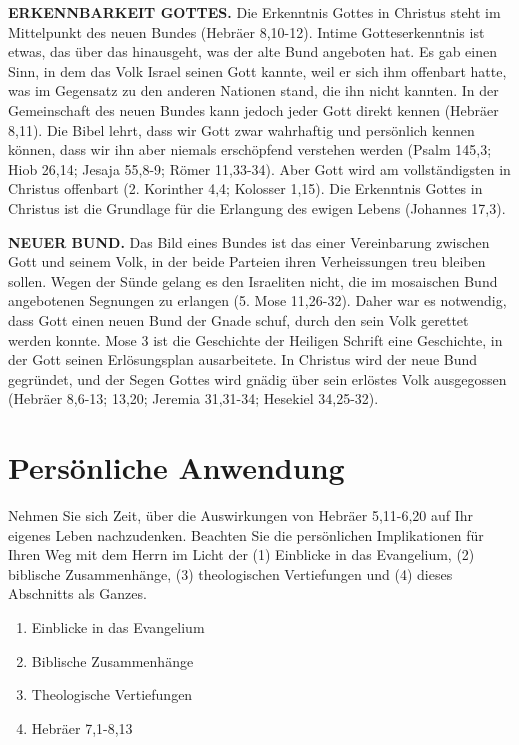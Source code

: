 \documentclass[]{krantz}
\providecommand{\tightlist}{%
  \setlength{\itemsep}{0pt}\setlength{\parskip}{0pt}}
\begin{document}
\textbf{ERKENNBARKEIT GOTTES.} Die Erkenntnis Gottes in Christus steht
im Mittelpunkt des neuen Bundes (Hebräer 8,10-12). Intime
Gotteserkenntnis ist etwas, das über das hinausgeht, was der alte Bund
angeboten hat. Es gab einen Sinn, in dem das Volk Israel seinen Gott
kannte, weil er sich ihm offenbart hatte, was im Gegensatz zu den
anderen Nationen stand, die ihn nicht kannten. In der Gemeinschaft des
neuen Bundes kann jedoch jeder Gott direkt kennen (Hebräer 8,11). Die
Bibel lehrt, dass wir Gott zwar wahrhaftig und persönlich kennen können,
dass wir ihn aber niemals erschöpfend verstehen werden (Psalm 145,3;
Hiob 26,14; Jesaja 55,8-9; Römer 11,33-34). Aber Gott wird am
vollständigsten in Christus offenbart (2. Korinther 4,4; Kolosser 1,15).
Die Erkenntnis Gottes in Christus ist die Grundlage für die Erlangung
des ewigen Lebens (Johannes 17,3).

\textbf{NEUER BUND.} Das Bild eines Bundes ist das einer Vereinbarung
zwischen Gott und seinem Volk, in der beide Parteien ihren Verheissungen
treu bleiben sollen. Wegen der Sünde gelang es den Israeliten nicht, die
im mosaischen Bund angebotenen Segnungen zu erlangen (5. Mose 11,26-32).
Daher war es notwendig, dass Gott einen neuen Bund der Gnade schuf,
durch den sein Volk gerettet werden konnte. Mose 3 ist die Geschichte
der Heiligen Schrift eine Geschichte, in der Gott seinen Erlösungsplan
ausarbeitete. In Christus wird der neue Bund gegründet, und der Segen
Gottes wird gnädig über sein erlöstes Volk ausgegossen (Hebräer 8,6-13;
13,20; Jeremia 31,31-34; Hesekiel 34,25-32).

\section{Persönliche Anwendung}\label{persuxf6nliche-anwendung-5}

Nehmen Sie sich Zeit, über die Auswirkungen von Hebräer 5,11-6,20 auf
Ihr eigenes Leben nachzudenken. Beachten Sie die persönlichen
Implikationen für Ihren Weg mit dem Herrn im Licht der (1) Einblicke in
das Evangelium, (2) biblische Zusammenhänge, (3) theologischen
Vertiefungen und (4) dieses Abschnitts als Ganzes.

\begin{enumerate}
\def\labelenumi{\arabic{enumi}.}
\tightlist
\item
  Einblicke in das Evangelium
\item
  Biblische Zusammenhänge
\item
  Theologische Vertiefungen
\item
  Hebräer 7,1-8,13
\end{enumerate}
\end{document}
